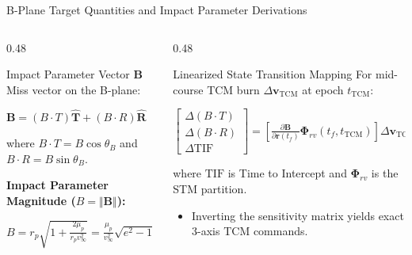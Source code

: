 \documentclass[aspectratio=169, 10pt]{beamer}
\begin{document}
\begin{frame}{B-Plane Target Quantities and Impact Parameter Derivations}
    \begin{columns}[t]
        \begin{column}{0.48\textwidth}
            \begin{block}{Impact Parameter Vector $\mathbf{B}$}
                \scriptsize
                Miss vector on the B-plane:
                \par\vspace{1pt}
                {\centering $\mathbf{B} = (B \cdot T)\hat{\mathbf{T}} + (B \cdot R)\hat{\mathbf{R}}$\par}
                \vspace{1pt}
                where $B \cdot T = B \cos \theta_B$ and $B \cdot R = B \sin \theta_B$.
                \par\vspace{3pt}
                \textbf{Impact Parameter Magnitude ($B = \Vert{}\mathbf{B}\Vert{}$):}
                \par\vspace{1pt}
                {\centering $\displaystyle B = r_p \sqrt{1 + \frac{2\mu_p}{r_p v_\infty^2}} = \frac{\mu_p}{v_\infty^2}\sqrt{e^2 - 1}$\par}
            \end{block}
        \end{column}

        \begin{column}{0.48\textwidth}
            \begin{alertblock}{Linearized State Transition Mapping}
                \scriptsize
                For mid-course TCM burn $\Delta \mathbf{v}_{\text{TCM}}$ at epoch $t_{\text{TCM}}$:
                \par\vspace{1pt}
                {\centering $\displaystyle \begin{bmatrix} \Delta(B \cdot T) \\ \Delta(B \cdot R) \\ \Delta \text{TIF} \end{bmatrix} = \left[ \frac{\partial \mathbf{B}}{\partial \mathbf{r}(t_f)} \boldsymbol{\Phi}_{r v}(t_f, t_{\text{TCM}}) \right] \Delta \mathbf{v}_{\text{TCM}}$\par}
                \vspace{1pt}
                where $\text{TIF}$ is Time to Intercept and $\boldsymbol{\Phi}_{rv}$ is the STM partition.
                \begin{itemize}\setlength{\itemsep}{1pt}\setlength{\topsep}{1pt}
                    \item Inverting the sensitivity matrix yields exact 3-axis TCM commands.
                \end{itemize}
            \end{alertblock}
        \end{column}
    \end{columns}
\end{frame}
\end{document}

